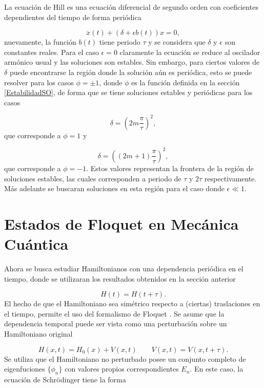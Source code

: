 \documentclass[a4paper,10pt]{report}
\begin{document}
La ecuación de Hill es una ecuación diferencial de segundo orden con coeficientes dependientes del tiempo de forma periódica\cite{WardFT}

\begin{equation}
\ddot{x}(t) + (\delta + \epsilon b(t))x = 0,
\end{equation} nuevamente, la función $b(t)$ tiene periodo $\tau$ y se considera que $\delta$ y $\epsilon$ son constantes reales. Para el caso $\epsilon = 0$ claramente la ecuación se reduce al oscilador armónico usual y las soluciones son estables. Sin embargo, para ciertos valores de $\delta$ puede encontrarse la región donde la solución aún es periódica, esto se puede resolver para los casos $\phi = \pm 1$, donde $\phi$ es la función definida en la sección \eqref{EstabilidadSO}, de forma que se tiene soluciones estables y periódicas para los casos

\begin{equation}
\delta = (2m\frac{\pi}{\tau})^2, 
\end{equation} que corresponde a $\phi=1$ y

\begin{equation}
\delta = ((2m+1)\frac{\pi}{\tau})^2,
\end{equation} que corresponde a $\phi=-1$. Estos valores representan la frontera de la región de soluciones estables, las cuales corresponden a periodo de $\tau$ y $2\tau$ respectivamente. Más adelante se buscaran soluciones en esta región para el caso donde $\epsilon \ll 1$.


\section{Estados de Floquet en Mecánica Cuántica}

Ahora se busca estudiar Hamiltonianos con una dependencia periódica en el tiempo, donde se utilizaran los resultados obtenidos en la sección anterior

\begin{equation}
H(t)=H(t+\tau).
\end{equation} El hecho de que el Hamiltoniano sea simétrico respecto a (ciertas) traslaciones en el tiempo, permite el uso del formalismo de Floquet \cite{HanngiDQS}. Se asume que la dependencia temporal puede ser vista como una perturbación sobre un Hamiltoniano original

\begin{equation}
H(x,t)=H_0(x)+V(x,t) \qquad V(x,t)=V(x,t+\tau).
\end{equation} Se utiliza que el Hamiltoniano no perturbado posee un conjunto completo de eigenfuciones $\{\phi_n\}$ con valores propios correspondientes $E_n$. En este caso, la ecuación de Schr\"{o}dinger tiene la forma
\end{document}
